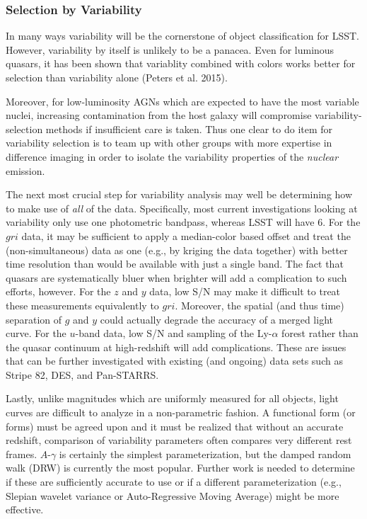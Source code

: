 \subsubsection{Selection by Variability}

In many ways variability will be the cornerstone of object
classification for LSST.  However, variability by itself is unlikely
to be a panacea.  Even for luminous quasars, it has been shown that
variablity combined with colors works better for selection than
variability alone (Peters et al. 2015).  

Moreover, for low-luminosity AGNs which are expected to have the most
variable nuclei, increasing contamination from the host galaxy will
compromise variability-selection methods if insufficient care is
taken.  Thus one clear to do item for variability selection is to team
up with other groups with more expertise in difference imaging in
order to isolate the variability properties of the {\em nuclear}
emission.

The next most crucial step for variability analysis may well be
determining how to make use of {\em all} of the data.  Specifically,
most current investigations looking at variability only use one
photometric bandpass, whereas LSST will have 6.  For the $gri$ data,
it may be sufficient to apply a median-color based offset and treat
the (non-simultaneous) data as one (e.g., by kriging the data
together) with better time resolution than would be available with
just a single band.  The fact that quasars are systematically bluer
when brighter will add a complication to such efforts, however.  For
the $z$ and $y$ data, low S/N may make it difficult to treat these
measurements equivalently to $gri$.  Moreover, the spatial (and thus
time) separation of $g$ and $y$ could actually degrade the accuracy of
a merged light curve.  For the $u$-band data, low S/N and sampling of
the Ly-$\alpha$ forest rather than the quasar continuum at
high-redshift will add complications.  These are issues that can be
further investigated with existing (and ongoing) data sets such as
Stripe 82, DES, and Pan-STARRS.

Lastly, unlike magnitudes which are uniformly measured for all
objects, light curves are difficult to analyze in a non-parametric
fashion.  A functional form (or forms) must be agreed upon and it must
be realized that without an accurate redshift, comparison of
variability parameters often compares very different rest frames.
$A$-$\gamma$ is certainly the simplest parameterization, but the
damped random walk (DRW) is currently the most popular.  Further work
is needed to determine if these are sufficiently accurate to use or if
a different parameterization (e.g., Slepian wavelet variance or
Auto-Regressive Moving Average) might be more effective.

